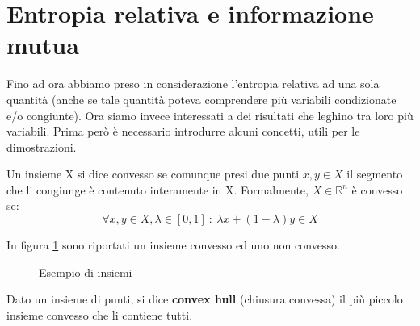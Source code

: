 \section{Entropia relativa e informazione mutua}
Fino ad ora abbiamo preso in considerazione l'entropia relativa ad una sola quantità (anche se tale quantità poteva comprendere più variabili condizionate e/o congiunte). Ora siamo invece interessati a dei risultati che leghino tra loro più variabili.
Prima però è necessario introdurre alcuni concetti, utili per le dimostrazioni.

\begin{definizione}
 Un insieme X si dice convesso se comunque presi due punti $x,y \in X$ il segmento che li congiunge è contenuto interamente in X.
 Formalmente, $X \in \mathbb{R}^n$ è convesso se:
 \[
  \forall x,y \in X, \lambda \in [0,1] \ : \ \lambda x + (1-\lambda) y \in X
 \]
\end{definizione}

\noindent
In figura \ref{convessi} sono riportati un insieme convesso ed uno non convesso.

\begin{figure}[htbp]
\centering
{}
\hspace{5mm}
\caption{Esempio di insiemi}
\label{convessi}
\end{figure}

\begin{definizione}
 Dato un insieme di punti, si dice \textbf{convex hull} (chiusura convessa) il più piccolo insieme convesso che li contiene tutti.
\end{definizione}

